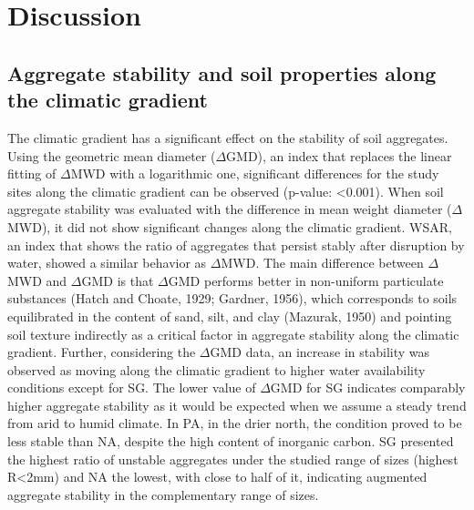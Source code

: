{\section{Discussion}

\subsection{Aggregate stability and soil properties along the climatic gradient}

The climatic gradient has a significant effect on the stability of soil aggregates. Using the geometric mean diameter ($\Delta$GMD), an index that replaces the linear fitting of $\Delta$MWD with a logarithmic one, significant differences for the study sites along the climatic gradient can be observed (p-value: <0.001). When soil aggregate stability was evaluated with the difference in mean weight diameter ($\Delta$MWD), it did not show significant changes along the climatic gradient. WSAR, an index that shows the ratio of aggregates that persist stably after disruption by water, showed a similar behavior as $\Delta$MWD. The main difference between $\Delta$MWD and $\Delta$GMD is that $\Delta$GMD performs better in non-uniform particulate substances (Hatch and Choate, 1929; Gardner, 1956), which corresponds to soils equilibrated in the content of sand, silt, and clay (Mazurak, 1950) and pointing soil texture indirectly as a critical factor in aggregate stability along the climatic gradient. Further, considering the $\Delta$GMD data, an increase in stability was observed as moving along the climatic gradient to higher water availability conditions except for SG. The lower value of $\Delta$GMD for SG indicates comparably higher aggregate stability as it would be expected when we assume a steady trend from arid to humid climate. In PA, in the drier north, the condition proved to be less stable than NA, despite the high content of inorganic carbon. SG presented the highest ratio of unstable aggregates under the studied range of sizes (highest R<2mm) and NA the lowest, with close to half of it, indicating augmented aggregate stability in the complementary range of sizes.

}
